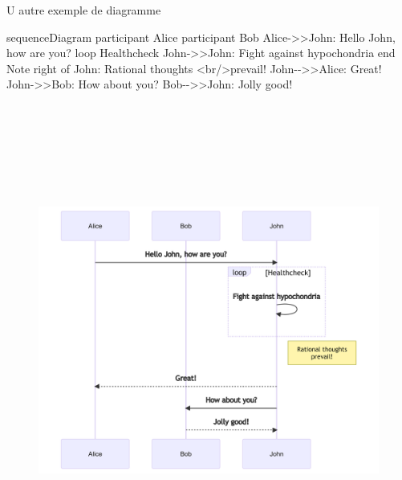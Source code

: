 \documentclass[
  12pt,
  a4paper,
]{scrbook}
\newenvironment{Shaded}{\begin{snugshade}}{\end{snugshade}}
\newcommand{\NormalTok}[1]{\textcolor[rgb]{0.40,0.48,0.51}{#1}}
\begin{document}
U autre exemple de diagramme

\begin{Shaded}
\begin{Highlighting}[numbers=left,,]

\NormalTok{sequenceDiagram}
\NormalTok{  participant Alice}
\NormalTok{  participant Bob}
\NormalTok{  Alice{-}\textgreater{}\textgreater{}John: Hello John, how are you?}
\NormalTok{  loop Healthcheck}
\NormalTok{    John{-}\textgreater{}\textgreater{}John: Fight against hypochondria}
\NormalTok{  end}
\NormalTok{  Note right of John: Rational thoughts \textless{}br/\textgreater{}prevail!}
\NormalTok{  John{-}{-}\textgreater{}\textgreater{}Alice: Great!}
\NormalTok{  John{-}\textgreater{}\textgreater{}Bob: How about you?}
\NormalTok{  Bob{-}{-}\textgreater{}\textgreater{}John: Jolly good!}
\end{Highlighting}
\end{Shaded}

\begin{figure}[H]

{\centering \includegraphics[width=7.81in,height=6.13in]{./03_resultats_files/figure-latex/mermaid-figure-2.png}

}

\end{figure}
\end{document}
